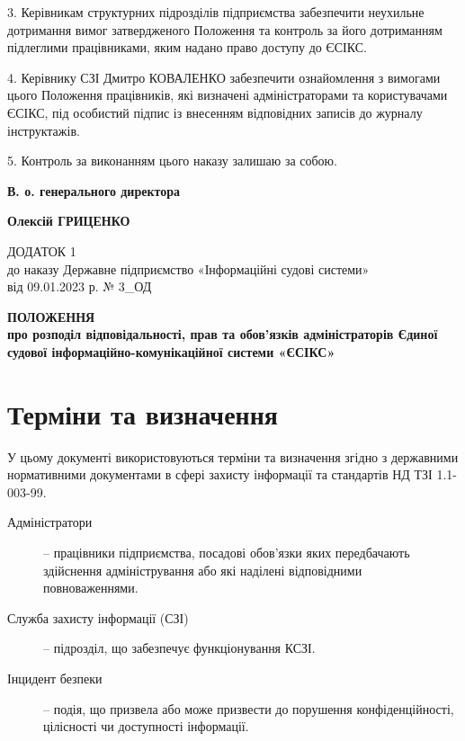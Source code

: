 \documentclass[12pt]{article}
\begin{document}
3. Керівникам структурних підрозділів підприємства забезпечити неухильне дотримання вимог затвердженого Положення та контроль за його дотриманням підлеглими працівниками, яким надано право доступу до ЄСІКС.

4. Керівнику СЗІ Дмитро КОВАЛЕНКО забезпечити ознайомлення з вимогами цього Положення працівників, які визначені адміністраторами та користувачами ЄСІКС, під особистий підпис із внесенням відповідних записів до журналу інструктажів.

5. Контроль за виконанням цього наказу залишаю за собою.

\vspace{1.5cm}

\noindent
\parbox[t]{0.5\textwidth}{\bfseries В. о. генерального директора}%
\parbox[t]{0.5\textwidth}{\raggedleft{}\bfseries Олексій ГРИЦЕНКО}

\newpage

\begin{flushright}
ДОДАТОК 1\\
до наказу Державне підприємство «Інформаційні судові системи»\\
від 09.01.2023 р. № 3\_\allowbreak{}ОД
\end{flushright}

\begin{center}
  \textbf{\Large{}ПОЛОЖЕННЯ}\\
  \textbf{\large{}про розподіл відповідальності, прав та обов'язків адміністраторів Єдиної судової інформаційно-комунікаційної системи «ЄСІКС»}
\end{center}

\vspace{0.5cm}

\section{Терміни та визначення}
У цьому документі використовуються терміни та визначення згідно з державними нормативними документами в сфері захисту інформації та стандартів НД ТЗІ 1.1-003-99.
\begin{description}
  \item[Адміністратори] -- працівники підприємства, посадові обов'язки яких передбачають здійснення адміністрування або які наділені відповідними повноваженнями.
  \item[Служба захисту інформації (СЗІ)] -- підрозділ, що забезпечує функціонування КСЗІ.
  \item[Інцидент безпеки] -- подія, що призвела або може призвести до порушення конфіденційності, цілісності чи доступності інформації.
\end{description}
\end{document}

